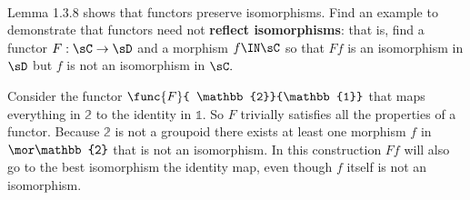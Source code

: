 \documentclass[main.tex]{subfiles}
\begin{document}
\paragraph{}
\begin{exercise}
	Lemma 1.3.8 shows that functors preserve isomorphisms. Find an example to
	demonstrate that functors need not \textbf{reflect isomorphisms}: that is,
	find a functor $ F:\sC\to\sD $ and a morphism $ f\IN\sC $ so that $ Ff $ is
	an isomorphism in $ \sD $ but $ f $ is not an isomorphism in $ \sC. $
\end{exercise}


Consider the functor $ \func{F}{ \mathbb{2}}{\mathbb{1}}$ that  maps everything in $\mathbb{2}$ to the identity in $ \mathbb{1}. $ So
$ F $ trivially satisfies all the properties of a functor. Because $ \mathbb{2}
$ is not a groupoid there exists at least one morphism $ f $ in $\mor \mathbb{2}
$ that is not an isomorphism. In this construction $ Ff $ will also go to the
best isomorphism the identity map, even though $ f $ itself is not an isomorphism.
\end{document}
